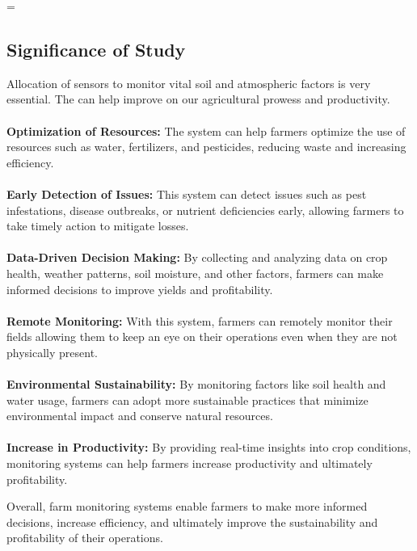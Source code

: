 =\documentclass[12pt, a4paper]{article}
\begin{document}
\newpage
\subsection{Significance of Study}
Allocation of sensors to monitor vital soil and atmospheric factors is very essential. The can help improve on our agricultural prowess and productivity. 
\\ \\
\textbf{Optimization of Resources:} The system can help farmers optimize the use of resources such as water, fertilizers, and pesticides, reducing waste and increasing efficiency.
\\ \\
\textbf{Early Detection of Issues:} This system can detect issues such as pest infestations, disease outbreaks, or nutrient deficiencies early, allowing farmers to take timely action to mitigate losses.
\\ \\
\textbf{Data-Driven Decision Making:} By collecting and analyzing data on crop health, weather patterns, soil moisture, and other factors, farmers can make informed decisions to improve yields and profitability.
\\ \\
\textbf{Remote Monitoring:} With this system, farmers can remotely monitor their fields allowing them to keep an eye on their operations even when they are not physically present.
\\ \\
\textbf{Environmental Sustainability:} By monitoring factors like soil health and water usage, farmers can adopt more sustainable practices that minimize environmental impact and conserve natural resources.
\\ \\
\textbf{Increase in Productivity:} By providing real-time insights into crop conditions, monitoring systems can help farmers increase productivity and ultimately profitability.


Overall, farm monitoring systems enable farmers to make more informed decisions, increase efficiency, and ultimately improve the sustainability and profitability of their operations.

\newpage
\end{document}
